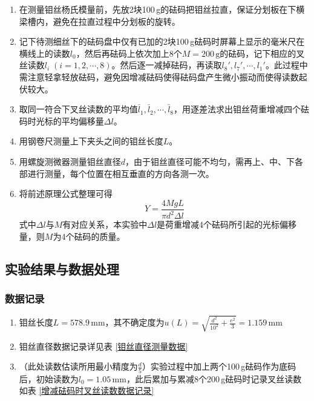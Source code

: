 \documentclass[UTF8]{article}
\theoremstyle{MyLineTheoremStyle} %
\theoremstyle{MyBlockTheoremStyle} %
\theoremstyle{MySubsubsectionStyle} %
\begin{document}
\begin{enumerate}
    \item 在测量钼丝杨氏模量前，先放2块100\,g的砝码把钼丝拉直，保证分划板在下横梁槽内，避免在拉直过程中分划板的旋转。
    \item 记下待测细丝下的砝码盘中仅有已加的2块100\,g砝码时屏幕上显示的毫米尺在横线上的读数$ l_0 $，然后再砝码上依次加上8个$ M=200\,\mathrm{g} $的砝码，记下相应的叉丝读数$ l_i\;(i=1,2,\cdots,8) $。然后逐一减掉砝码，再读取$ l_8',l_7',\cdots,l_1' $。此过程中需注意轻拿轻放砝码，避免因增减砝码使得砝码盘产生微小振动而使得读数起伏较大。
    \item 取同一符合下叉丝读数的平均值$ \bar l_1,\bar l_2,\cdots,\bar l_8 $，用逐差法求出钼丝荷重增减四个砝码时光标的平均偏移量$ \Delta l $。
    \item 用钢卷尺测量上下夹头之间的钼丝长度$ L $。
    \item 用螺旋测微器测量钼丝直径$ d $，由于钼丝直径可能不均匀，需再上、中、下各部进行测量，每个位置在相互垂直的方向各测一次。
    \item 将前述原理公式整理可得
	\begin{equation}\label{1-Yang}
		Y=\frac{4MgL}{\pi d^2\Delta l}
	\end{equation}
	式中$ \Delta l $与$ M $有对应关系，本实验中$ \Delta l $是荷重增减4个砝码所引起的光标偏移量，则$ M $为4个砝码的质量。
\end{enumerate}

\subsection{实验结果与数据处理}

\subsubsection{数据记录}

\begin{enumerate}
    \item 钼丝长度$ L=578.9\,\mathrm{mm} $，其不确定度为$ u(L)=\sqrt{\frac{d^2}{10^2}+\frac{e^2}{3}}=1.159\,\mathrm{mm} $
    \item 钼丝直径数据记录详见表 \ref{钼丝直径测量数据}
    \item （此处读数估读所用最小精度为$ \frac d5 $）实验过程中加上两个100\,g砝码作为底码后，初始读数为$ l_0=1.05\,\mathrm{mm} $，此后累加与累减8个200\,g砝码时记录叉丝读数如表 \ref{增减砝码时叉丝读数数据记录}
\end{enumerate}
\end{document}
